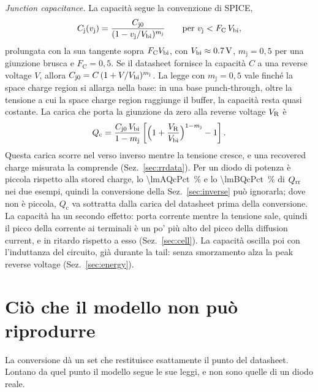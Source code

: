 \documentclass[10pt,a4paper]{scrartcl}
\let\newcommand\pdvaluedefine
\newcommand{\VR}{V_\mathrm{R}}
\newcommand{\Qrr}{Q_\mathrm{rr}}
\newcommand{\vj}{v_\mathrm{j}}
\newcommand{\Cj}{C_\mathrm{j}}
\newcommand{\Cjo}{C_\mathrm{j0}}
\newcommand{\Vbi}{V_\mathrm{bi}}
\begin{document}
\emph{Junction capacitance.} La capacità segue la convenzione di SPICE,
\begin{equation}
\Cj(\vj) = \frac{\Cjo}{(1 - \vj/\Vbi)^{m_\mathrm{j}}} \qquad \text{per } \vj < F_\mathrm{C}\,\Vbi ,
\label{eq:cj}
\end{equation}
prolungata con la sua tangente sopra $F_\mathrm{C} \Vbi$, con $\Vbi \approx \SI{0.7}{\volt}$, $m_\mathrm{j} = 0,5$ per una giunzione brusca e $F_\mathrm{C} = 0,5$. Se il datasheet fornisce la capacità $C$ a una reverse voltage $V$, allora $\Cjo = C\,(1+V/\Vbi)^{m_\mathrm{j}}$. La legge con $m_\mathrm{j} = 0,5$ vale finché la space charge region si allarga nella base: in una base punch-through, oltre la tensione a cui la space charge region raggiunge il buffer, la capacità resta quasi costante. La carica che porta la giunzione da zero alla reverse voltage $\VR$ è
\begin{equation}
Q_\mathrm{c} = \frac{\Cjo\,\Vbi}{1-m_\mathrm{j}}\left[\Bigl(1+\frac{\VR}{\Vbi}\Bigr)^{1-m_\mathrm{j}} - 1\right] .
\label{eq:qc}
\end{equation}
Questa carica scorre nel verso inverso mentre la tensione cresce, e una recovered charge misurata la comprende (Sez.~\ref{sec:rrdata}). Per un diodo di potenza è piccola rispetto alla stored charge, lo \SI{\lmAQcPct}{\percent} e lo \SI{\lmBQcPct}{\percent} di $\Qrr$ nei due esempi, quindi la conversione della Sez.~\ref{sec:inverse} può ignorarla; dove non è piccola, $Q_\mathrm{c}$ va sottratta dalla carica del datasheet prima della conversione. La capacità ha un secondo effetto: porta corrente mentre la tensione sale, quindi il picco della corrente ai terminali è un po' più alto del picco della diffusion current, e in ritardo rispetto a esso (Sez.~\ref{sec:cell}). La capacità oscilla poi con l'induttanza del circuito, già durante la tail: senza smorzamento alza la peak reverse voltage (Sez.~\ref{sec:energy}).

\section{Ciò che il modello non può riprodurre}
\label{sec:limits}
La conversione dà un set che restituisce esattamente il punto del datasheet. Lontano da quel punto il modello segue le sue leggi, e non sono quelle di un diodo reale.
\end{document}
